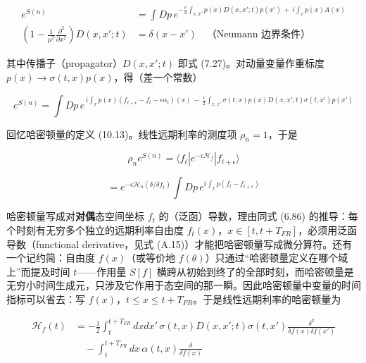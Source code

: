 \begin{equation*}
\begin{aligned}
e^{S(n)}&=\int Dp\,e^{-\frac{\epsilon}{2}\int_{x,x'}p(x)D(x,x';t)p(x')\,+\,i\int_x p(x)A(x)}\\
\left(1-\frac{1}{\mu^2}\frac{\partial^2}{\partial x^2}\right)D(x,x';t)&=\delta(x-x')\quad\text{（Neumann 边界条件）}
\end{aligned}
\tag{10.26}
\end{equation*}

其中传播子（propagator）$D(x,x';t)$ 即式 (7.27)。对动量变量作重标度 $p(x)\to\sigma(t,x)p(x)$，得（差一个常数）

\begin{equation*}
e^{S(n)}=\int Dp\,e^{\,i\int_x p(x)(f_{t+\epsilon}-f_t-\epsilon\alpha_t)(x)\,-\,\frac{\epsilon}{2}\int_{x,x'}\sigma(t,x)p(x)D(x,x';t)\sigma(t,x')p(x')}
\tag{10.27}
\end{equation*}

回忆哈密顿量的定义 (10.13)。线性远期利率的测度项 $\rho_n=1$，于是

\begin{equation*}
\rho_n e^{S(n)}=\langle f_t|e^{-\epsilon\mathcal{H}_f}|f_{t+\epsilon}\rangle
\tag{10.28}
\end{equation*}

\begin{equation*}
=e^{-\epsilon\mathcal{H}_n(\delta/\delta f_t)}\int Dp\,e^{i\int_x p(f_t-f_{t+\epsilon})}
\tag{10.29}
\end{equation*}

哈密顿量写成对\textbf{对偶}态空间坐标 $f_t$ 的（泛函）导数，理由同式 (6.86) 的推导：每个时刻有无穷多个独立的远期利率自由度 $f_t(x)$，$x\in[t,t+T_{FR}]$，必须用泛函导数（functional derivative，见式 (A.15)）才能把哈密顿量写成微分算符。还有一个记约简：自由度 $f(x)$（或等价地 $f(\theta)$）只通过“哈密顿量定义在哪个域上”而提及时间 $t$——作用量 $S[f]$ 横跨从初始到终了的全部时刻，而哈密顿量是无穷小时间生成元，只涉及它作用于态空间的那一瞬。因此哈密顿量中变量的时间指标可以省去：写 $f(x)$，$t\le x\le t+T_{FR}$。于是线性远期利率的哈密顿量为

\begin{equation*}
\begin{aligned}
\mathcal{H}_f(t)&=-\frac{1}{2}\int_t^{t+T_{FR}}dxdx'\,\sigma(t,x)D(x,x';t)\sigma(t,x')\frac{\delta^2}{\delta f(x)\delta f(x')}\\
&\quad-\int_t^{t+T_{FR}}dx\,\alpha(t,x)\frac{\delta}{\delta f(x)}
\end{aligned}
\tag{10.30}
\end{equation*}

